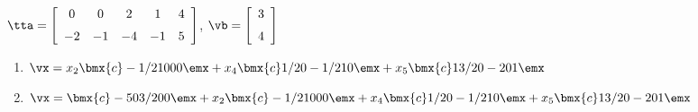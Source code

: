 {$\tta = \left[ \begin {array}{ccccc} 0&0&2&1&4\\\noalign{\medskip}-2&-1&-4&-1
&5\end {array} \right]$, 
$\vb=\left[ \begin {array}{c} 3\\\noalign{\medskip}4\end {array} \right]$}
{\begin{enumerate}
\item	 $\vx=x_2\bmx{c}-1/2\\1\\0\\0\\0\emx+x_4\bmx{c}1/2\\0\\-1/2\\1\\0\emx+x_5\bmx{c}13/2\\0\\-2\\0\\1\emx$

\item	$\vx=\bmx{c}-5\\0\\ 3/2 \\0\\0\emx + x_2\bmx{c}-1/2\\1\\0\\0\\0\emx+x_4\bmx{c}1/2 \\0\\-1/2\\1\\0\emx+x_5\bmx{c}13/2\\0\\-2\\0\\1\emx$
\end{enumerate}}

 



  

